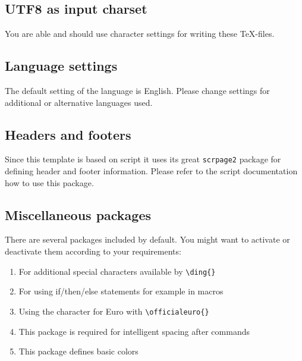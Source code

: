 \subsection{UTF8 as input charset}

You are able and should use  character settings for writing these \TeX{}-files.


\subsection{Language settings}

The default setting of the language is English. Please change settings for
additional or alternative languages used.


\subsection{Headers and footers}

Since this template is based on  script it uses its great \texttt{scrpage2}
package for defining header and footer information. Please refer to the 
script documentation how to use this package.


\subsection{Miscellaneous packages} \label{subsec:miscpackages}

There are several packages included by default. You might want to activate or
deactivate them according to your requirements:

\begin{enumerate}
\item[\texttt{\href{https://secure.wikimedia.org/wikibooks/en/wiki/LaTeX/Formatting\#Other\_symbols}{%
pifont%
}}] 
For additional special characters available by \verb#\ding{}#
\item[\texttt{\href{http://ctan.org/pkg/ifthen}{%
ifthen%
}}] 
For using if/then/else statements for example in macros
\item[\texttt{\href{http://www.ctan.org/tex-archive/fonts/eurosym}{%
eurosym%
}}] 
Using the character for Euro with \verb#\officialeuro{}#
\item[\texttt{\href{http://www.ctan.org/tex-archive/help/Catalogue/entries/xspace.html}{%
xspace%
}}] 
This package is required for intelligent spacing after commands
\item[\texttt{\href{https://secure.wikimedia.org/wikibooks/en/wiki/LaTeX/Colors}{%
color%
}}] 
This package defines basic colors
\end{enumerate}
